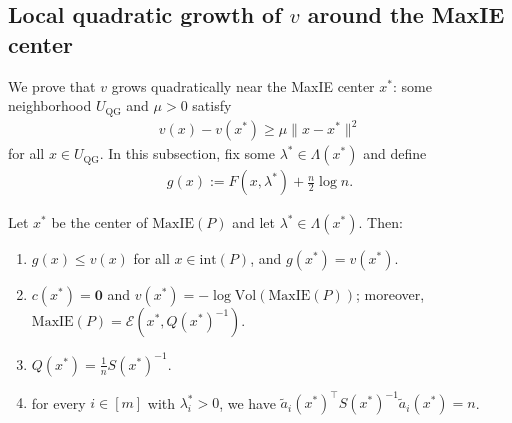 \documentclass[smallextended]{svjour3}
\newcommand{\V}{{\mathrm{Vol}}}
\newcommand{\E}{\mathcal{E}}
\newcommand{\MaxIE}{\mathrm{MaxIE}}
\begin{document}
\subsection[Local quadratic growth of v around the MaxIE center]{Local quadratic growth of $v$ around the MaxIE center}
We prove that $v$ grows quadratically near the MaxIE center $x^*$: some
neighborhood $U_{\mathrm{QG}}$ and $\mu>0$ satisfy
\begin{align*}
    v(x) - v(x^*) \geq \mu \|x-x^*\|^2
\end{align*}
for all $x\in U_{\mathrm{QG}}$. In this subsection, fix some $\lambda^*\in\Lambda(x^*)$ and define
\begin{align}\label{eq: valued_function_with_optimal_dual}
    g(x) := F(x, \lambda^*) + \frac{n}{2}\log n.
\end{align}
\begin{lemma}\label{lemma: facts_about_g}
Let $x^*$ be the center of $\MaxIE(P)$ and let
$\lambda^*\in\Lambda(x^*)$. Then:
\begin{enumerate}
    \item $g(x) \leq v(x)$ for all $x \in \mathrm{int}(P)$, and $g(x^*) = v(x^*)$.
    \item $c(x^*)=\mathbf0$ and
    $v(x^*)=-\log\V(\MaxIE(P))$; moreover,\\
    $\MaxIE(P)=\E(x^*,Q(x^*)^{-1})$.
    \item $Q(x^*) = \frac{1}{n}S(x^*)^{-1}$.
    \item for every $i\in [m]$ with $\lambda^*_i > 0$, we have $\tilde{a}_i(x^*)^\top S(x^*)^{-1}\tilde{a}_i(x^*) = n$.
\end{enumerate}
\end{lemma}
\end{document}

